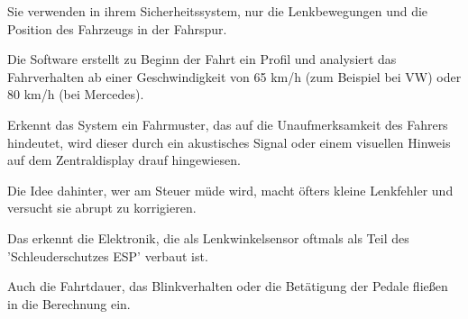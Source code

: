 Sie verwenden in ihrem Sicherheitssystem, nur die Lenkbewegungen und die Position des Fahrzeugs in der Fahrspur. 

Die Software erstellt zu Beginn der Fahrt ein Profil und analysiert das Fahrverhalten ab einer Geschwindigkeit von 65 km/h (zum Beispiel bei VW) oder 80 km/h (bei Mercedes).

Erkennt das System ein Fahrmuster, das auf die Unaufmerksamkeit des Fahrers hindeutet, wird dieser durch ein akustisches Signal oder einem visuellen Hinweis auf dem Zentraldisplay drauf hingewiesen.

Die Idee dahinter, wer am Steuer müde wird, macht öfters kleine Lenkfehler und versucht sie abrupt zu korrigieren. 

Das erkennt die Elektronik, die als Lenkwinkelsensor oftmals als Teil des 'Schleuderschutzes ESP' verbaut ist. 

Auch die Fahrtdauer, das Blinkverhalten oder die Betätigung der Pedale fließen in die Berechnung ein.\cite{b4}
\newline
\newline




 